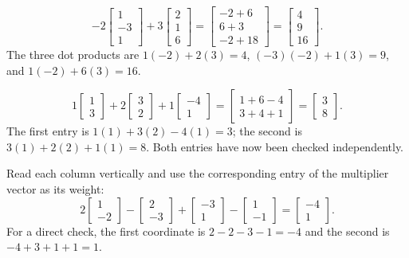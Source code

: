 \[-2\begin{bmatrix}1\\-3\\1\end{bmatrix}
+3\begin{bmatrix}2\\1\\6\end{bmatrix}
=\begin{bmatrix}-2+6\\6+3\\-2+18\end{bmatrix}
=\begin{bmatrix}4\\9\\16\end{bmatrix}.\]
The three dot products are $1(-2)+2(3)=4$,
$(-3)(-2)+1(3)=9$, and $1(-2)+6(3)=16$.

\[1\begin{bmatrix}1\\3\end{bmatrix}
+2\begin{bmatrix}3\\2\end{bmatrix}
+1\begin{bmatrix}-4\\1\end{bmatrix}
=\begin{bmatrix}1+6-4\\3+4+1\end{bmatrix}
=\begin{bmatrix}3\\8\end{bmatrix}.\]
The first entry is $1(1)+3(2)-4(1)=3$; the second is
$3(1)+2(2)+1(1)=8$. Both entries have now been checked independently.

Read each column vertically and use the corresponding entry of the
multiplier vector as its weight:
\[2\begin{bmatrix}1\\-2\end{bmatrix}
-\begin{bmatrix}2\\-3\end{bmatrix}
+\begin{bmatrix}-3\\1\end{bmatrix}
-\begin{bmatrix}1\\-1\end{bmatrix}
=\begin{bmatrix}-4\\1\end{bmatrix}.\]
For a direct check, the first coordinate is $2-2-3-1=-4$ and the
second is $-4+3+1+1=1$.

